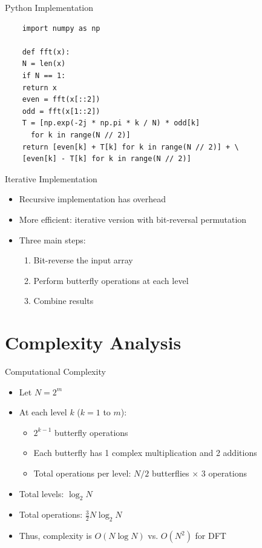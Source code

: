 \documentclass{beamer}
\begin{document}
\begin{frame}[fragile]{Python Implementation}
  \begin{lstlisting}
    import numpy as np

    def fft(x):
    N = len(x)
    if N == 1:
    return x
    even = fft(x[::2])
    odd = fft(x[1::2])
    T = [np.exp(-2j * np.pi * k / N) * odd[k]
      for k in range(N // 2)]
    return [even[k] + T[k] for k in range(N // 2)] + \
    [even[k] - T[k] for k in range(N // 2)]
  \end{lstlisting}
\end{frame}

\begin{frame}{Iterative Implementation}
  \begin{itemize}
  \item Recursive implementation has overhead
  \item More efficient: iterative version with bit-reversal permutation
  \item Three main steps:
    \begin{enumerate}
    \item Bit-reverse the input array
    \item Perform butterfly operations at each level
    \item Combine results
    \end{enumerate}
  \end{itemize}
\end{frame}

\section{Complexity Analysis}

\begin{frame}{Computational Complexity}
  \begin{itemize}
  \item Let $N = 2^m$
  \item At each level $k$ ($k = 1$ to $m$):
    \begin{itemize}
    \item $2^{k-1}$ butterfly operations
    \item Each butterfly has 1 complex multiplication and 2 additions
    \item Total operations per level: $N/2$ butterflies $\times$ 3 operations
    \end{itemize}
  \item Total levels: $\log_2 N$
  \item Total operations: $\frac{3}{2} N \log_2 N$
  \item Thus, complexity is $O(N \log N)$ vs. $O(N^2)$ for DFT
  \end{itemize}
\end{frame}
\end{document}
